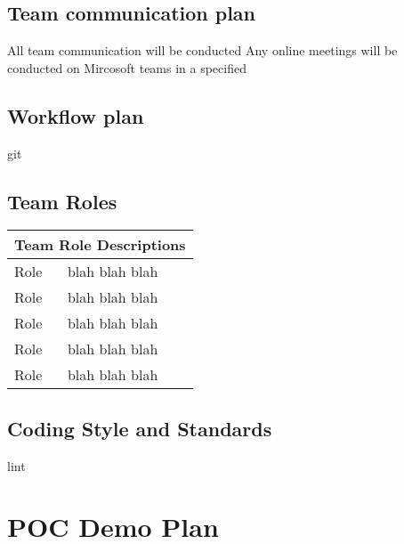 \documentclass{article}
\begin{document}
	\subsection{Team communication plan}
	All team communication will be conducted 
	Any online meetings will be conducted on Mircosoft teams in a specified 
	
	\subsection{Workflow plan}
	git
	
	\subsection{Team Roles}
	\begin{tabular}{ |p{5cm}|p{8cm}| }
		\hline
		\multicolumn{2}{|c|}{Team Role Descriptions} \\
		\hline
		Role & blah blah blah \\
		\hline
		Role & blah blah blah \\
		\hline
		Role & blah blah blah \\
		\hline
		Role & blah blah blah \\
		\hline
		Role & blah blah blah \\
		\hline
	\end{tabular}
	
	\subsection{Coding Style and Standards}
	lint
	
	\section {POC Demo Plan}
	
\end{document}

